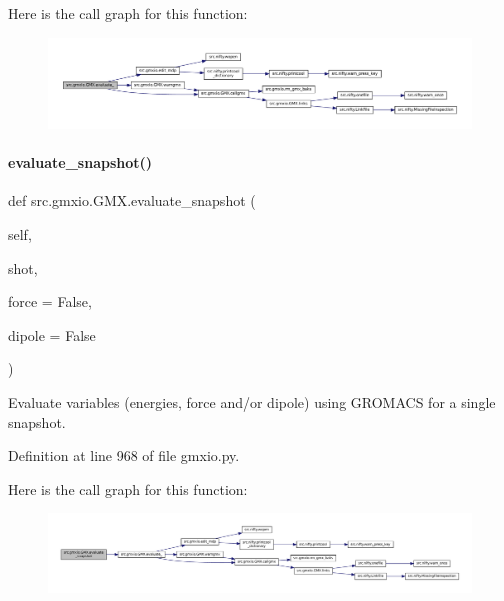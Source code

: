 Here is the call graph for this function\+:
\nopagebreak
\begin{figure}[H]
\begin{center}
\leavevmode
\includegraphics[width=350pt]{classsrc_1_1gmxio_1_1GMX_aece1608d0fc0b3a2a121edb09ac30f75_cgraph}
\end{center}
\end{figure}
\mbox{\label{classsrc_1_1gmxio_1_1GMX_ac5273754ebbd61d4798b4acc4f4479bc}} 
\paragraph{\texorpdfstring{evaluate\+\_\+snapshot()}{evaluate\_snapshot()}}
{\footnotesize\ttfamily def src.\+gmxio.\+G\+M\+X.\+evaluate\+\_\+snapshot (\begin{DoxyParamCaption}\item[{}]{self,  }\item[{}]{shot,  }\item[{}]{force = {\ttfamily False},  }\item[{}]{dipole = {\ttfamily False} }\end{DoxyParamCaption})}



Evaluate variables (energies, force and/or dipole) using G\+R\+O\+M\+A\+CS for a single snapshot. 



Definition at line 968 of file gmxio.\+py.

Here is the call graph for this function\+:
\nopagebreak
\begin{figure}[H]
\begin{center}
\leavevmode
\includegraphics[width=350pt]{classsrc_1_1gmxio_1_1GMX_ac5273754ebbd61d4798b4acc4f4479bc_cgraph}
\end{center}
\end{figure}
\mbox{\label{classsrc_1_1gmxio_1_1GMX_ab183586fa000692169f9904269add851}} 
